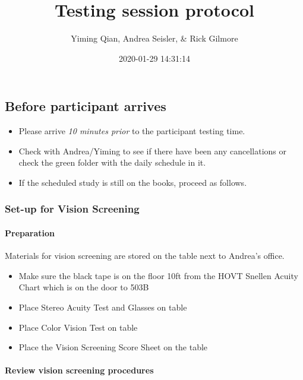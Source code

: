 \documentclass[]{article}
\title{Testing session protocol}
\author{Yiming Qian, Andrea Seisler, \& Rick Gilmore}
\date{2020-01-29 14:31:14}
\providecommand{\tightlist}{%
  \setlength{\itemsep}{0pt}\setlength{\parskip}{0pt}}
\let\oldparagraph\paragraph
\renewcommand{\paragraph}[1]{\oldparagraph{#1}\mbox{}}
\begin{document}
\maketitle

{
\setcounter{tocdepth}{3}
\tableofcontents
}
\subsection{Before participant
arrives}\label{before-participant-arrives}

\begin{itemize}
\tightlist
\item
  Please arrive \emph{10 minutes prior} to the participant testing time.
\item
  Check with Andrea/Yiming to see if there have been any cancellations
  or check the green folder with the daily schedule in it.
\item
  If the scheduled study is still on the books, proceed as follows.
\end{itemize}

\subsubsection{Set-up for Vision
Screening}\label{set-up-for-vision-screening}

\paragraph{Preparation}\label{preparation}

Materials for vision screening are stored on the table next to Andrea's
office.

\begin{itemize}
\tightlist
\item
  Make sure the black tape is on the floor 10ft from the HOVT Snellen
  Acuity Chart which is on the door to 503B
\item
  Place Stereo Acuity Test and Glasses on table
\item
  Place Color Vision Test on table
\item
  Place the Vision Screening Score Sheet on the table
\end{itemize}

\paragraph{Review vision screening
procedures}\label{review-vision-screening-procedures}
\end{document}
